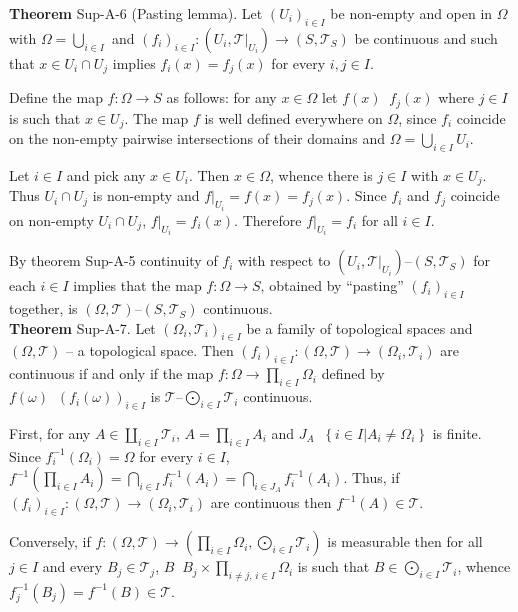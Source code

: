 \documentclass[a4paper]{article}
\newcommand{\obj}[1]{\left\{ #1 \right \}}
\newcommand{\brac}[1]{\left ( #1 \right )}
\newcommand{\induc}[1]{\left . #1 \right \vert}
\newcommand{\Tcal}{\mathcal{T}}
\newcommand{\defn}{\mathop{\overset{\Delta}{=}}\nolimits}
\begin{document}
\label{thm:cont_pasting} \noindent \textbf{Theorem} Sup-A-6 (Pasting lemma).
Let $\brac{U_i}_{i\in I}$ be non-empty and open in $\Omega$ with $\Omega =\bigcup_{i\in I}$ and $\brac{f_i}_{i\in I}:\brac{U_i, \induc{\Tcal}_{U_i}} \to \brac{S, \Tcal_S}$ be continuous and such that $x\in U_i\cap U_j$ implies $f_i\brac{x}=f_j\brac{x}$ for every $i,j\in I$.

Define the map $f:\Omega\to S$ as follows: for any $x\in \Omega$ let $f\brac{x}\defn f_j\brac{x}$ where $j\in I$ is such that $x\in U_j$. The map $f$ is well defined everywhere on $\Omega$, since $f_i$ coincide on the non-empty pairwise intersections of their domains and $\Omega = \bigcup_{i\in I} U_i$. 

Let $i\in I$ and pick any $x\in U_i$. Then $x\in \Omega$, whence there is $j\in I$ with $x\in U_j$. Thus $U_i\cap U_j$ is non-empty and $\induc{f}_{U_i} = f\brac{x} = f_j\brac{x}$. Since $f_i$ and $f_j$ coincide on non-empty $U_i\cap U_j$, $\induc{f}_{U_i} = f_i\brac{x}$. Therefore $\induc{f}_{U_i}=f_i$ for all $i\in I$.

By theorem Sup-A-5 continuity of $f_i$ with respect to $\brac{U_i, \induc{\Tcal}_{U_i}}$--$\brac{S, \Tcal_S}$ for each $i\in I$ implies that the map $f:\Omega\to S$, obtained by ``pasting'' $\brac{f_i}_{i\in I}$ together, is $\brac{\Omega, \Tcal}$--$\brac{S, \Tcal_S}$ continuous.\\

\label{thm:cont_concat} \noindent \textbf{Theorem} Sup-A-7.
Let $\brac{\Omega_i, \Tcal_i}_{i\in I}$ be a family of topological spaces and $\brac{\Omega, \Tcal}$ -- a topological space. Then $\brac{f_i}_{i\in I}:\brac{\Omega, \Tcal}\to\brac{\Omega_i, \Tcal_i}$ are continuous if and only if the map $f:\Omega\to \prod_{i\in I} \Omega_i$ defined by $f\brac{\omega}\defn \brac{f_i\brac{\omega}}_{i\in I}$ is $\Tcal$--$\bigodot_{i\in I} \Tcal_i$ continuous.

First, for any $A\in \coprod_{i\in I} \Tcal_i$, $A = \prod_{i\in I} A_i$ and $J_A\defn \obj{ \induc{i\in I} A_i\neq \Omega_i }$ is finite. Since $f^{-1}_i\brac{\Omega_i} = \Omega$ for every $i\in I$, $f^{-1}\brac{\prod_{i\in I} A_i} = \bigcap_{i\in I} f^{-1}_i\brac{A_i} = \bigcap_{i\in J_A} f^{-1}_i\brac{A_i}$. Thus, if $\brac{f_i}_{i\in I}:\brac{\Omega, \Tcal}\to\brac{\Omega_i, \Tcal_i}$ are continuous then $f^{-1}\brac{A}\in \Tcal$.

Conversely, if $f:\brac{\Omega, \Tcal}\to \brac{\prod_{i\in I} \Omega_i, \bigodot_{i\in I} \Tcal_i}$ is measurable then for all $j \in I$ and every $B_j\in \Tcal_j$, $B\defn B_j\times \prod_{i\neq j,\,i\in I} \Omega_i$ is such that $B \in \bigodot_{i\in I} \Tcal_i$, whence $f_j^{-1}\brac{B_j} = f^{-1}\brac{B} \in \Tcal$.\\
\end{document}
